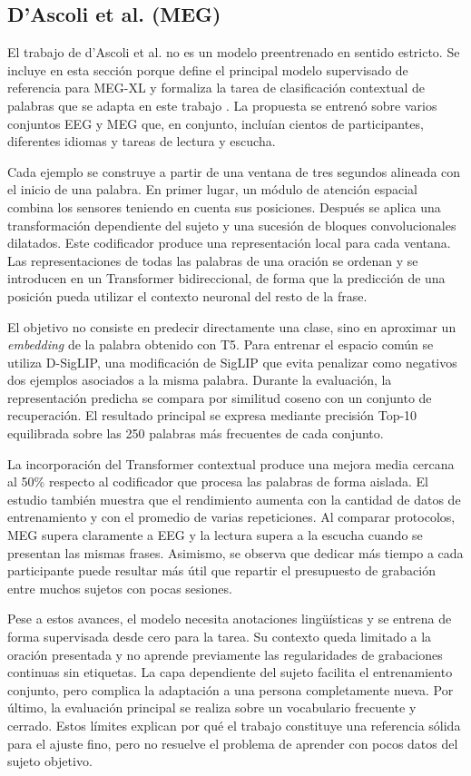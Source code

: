 \subsection{D'Ascoli et al. (MEG)}

El trabajo de d'Ascoli et al. no es un modelo preentrenado en sentido estricto. Se incluye en esta sección porque define el principal modelo supervisado de referencia para MEG-XL y formaliza la tarea de clasificación contextual de palabras que se adapta en este trabajo \cite{dascoli2024words}. La propuesta se entrenó sobre varios conjuntos EEG y MEG que, en conjunto, incluían cientos de participantes, diferentes idiomas y tareas de lectura y escucha.

Cada ejemplo se construye a partir de una ventana de tres segundos alineada con el inicio de una palabra. En primer lugar, un módulo de atención espacial combina los sensores teniendo en cuenta sus posiciones. Después se aplica una transformación dependiente del sujeto y una sucesión de bloques convolucionales dilatados. Este codificador produce una representación local para cada ventana. Las representaciones de todas las palabras de una oración se ordenan y se introducen en un Transformer bidireccional, de forma que la predicción de una posición pueda utilizar el contexto neuronal del resto de la frase.

El objetivo no consiste en predecir directamente una clase, sino en aproximar un \textit{embedding} de la palabra obtenido con T5. Para entrenar el espacio común se utiliza D-SigLIP, una modificación de SigLIP que evita penalizar como negativos dos ejemplos asociados a la misma palabra. Durante la evaluación, la representación predicha se compara por similitud coseno con un conjunto de recuperación. El resultado principal se expresa mediante precisión Top-10 equilibrada sobre las 250 palabras más frecuentes de cada conjunto.

La incorporación del Transformer contextual produce una mejora media cercana al 50\% respecto al codificador que procesa las palabras de forma aislada. El estudio también muestra que el rendimiento aumenta con la cantidad de datos de entrenamiento y con el promedio de varias repeticiones. Al comparar protocolos, MEG supera claramente a EEG y la lectura supera a la escucha cuando se presentan las mismas frases. Asimismo, se observa que dedicar más tiempo a cada participante puede resultar más útil que repartir el presupuesto de grabación entre muchos sujetos con pocas sesiones.

Pese a estos avances, el modelo necesita anotaciones lingüísticas y se entrena de forma supervisada desde cero para la tarea. Su contexto queda limitado a la oración presentada y no aprende previamente las regularidades de grabaciones continuas sin etiquetas. La capa dependiente del sujeto facilita el entrenamiento conjunto, pero complica la adaptación a una persona completamente nueva. Por último, la evaluación principal se realiza sobre un vocabulario frecuente y cerrado. Estos límites explican por qué el trabajo constituye una referencia sólida para el ajuste fino, pero no resuelve el problema de aprender con pocos datos del sujeto objetivo.

